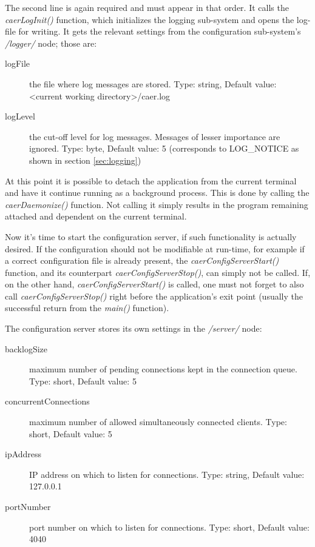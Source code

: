 \documentclass[a4paper,12pt]{report}
\begin{document}
The second line is again required and must appear in that order. It calls the \emph{caerLogInit()} function, which initializes the logging sub-system and opens the log-file for writing.
It gets the relevant settings from the configuration sub-system's \emph{/logger/} node; those are:
\begin{description}
\item[logFile] the file where log messages are stored.
\subitem Type: string, Default value: <current working directory>/caer.log
\item[logLevel] the cut-off level for log messages. Messages of lesser importance are ignored.
\subitem Type: byte, Default value: 5 (corresponds to LOG\_NOTICE as shown in section \ref{sec:logging})
\end{description}

At this point it is possible to detach the application from the current terminal and have it continue running as a background process. This is done by calling the \emph{caerDaemonize()} function. Not calling it simply results in the program remaining attached and dependent on the current terminal.

Now it's time to start the configuration server, if such functionality is actually desired. If the configuration should not be modifiable at run-time, for example if a correct configuration file is already present, the \emph{caerConfigServerStart()} function, and its counterpart \emph{caerConfigServerStop()}, can simply not be called.
If, on the other hand, \emph{caerConfigServerStart()} is called, one must not forget to also call \emph{caerConfigServerStop()} right before the application's exit point (usually the successful return from the \emph{main()} function).

The configuration server stores its own settings in the \emph{/server/} node:
\begin{description}
\item[backlogSize] maximum number of pending connections kept in the connection queue.
\subitem Type: short, Default value: 5
\item[concurrentConnections] maximum number of allowed simultaneously connected clients.
\subitem Type: short, Default value: 5
\item[ipAddress] IP address on which to listen for connections.
\subitem Type: string, Default value: 127.0.0.1
\item[portNumber] port number on which to listen for connections.
\subitem Type: short, Default value: 4040
\end{description}
\end{document}
